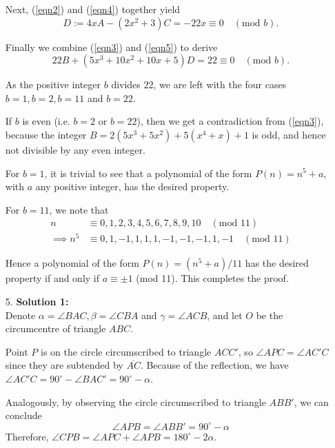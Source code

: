 \documentclass[a4paper, 12pt]{article}
\begin{document}
\begin{enumerate}
	Next, (\ref{eqn2}) and (\ref{eqn4}) together yield
	\begin{equation} \label{eqn5}
	    D := 4xA - (2x^2 + 3)C = -22x \equiv 0 \quad (\textrm{mod } b).
	\end{equation}
	
	Finally we combine (\ref{eqn3}) and (\ref{eqn5}) to derive
	\begin{equation*}
	    22B + (5x^3 + 10x^2 + 10x + 5)D = 22 \equiv 0 \quad (\textrm{mod } b).
	\end{equation*}
	
	As the positive integer $b$ divides $22$, we are left with the four cases $b = 1, b = 2, b = 11$ and $b = 22$.
	
    If $b$ is even (i.e. $b = 2$ or $b = 22$), then we get a contradiction from (\ref{eqn3}), because the integer $B = 2(5x^3 + 5x^2) + 5(x^4 + x) + 1$ is odd, and hence not divisible by any even integer.
    
    For $b = 1$, it is trivial to see that a polynomial of the form $P(n) = n^5 + a$, with $a$ any positive integer, has the desired property.
    
    For $b = 11$, we note that
    \begin{align*}
        n &\equiv 0, 1, 2, 3, 4, 5, 6, 7, 8, 9, 10 \quad (\textrm{mod } 11) \\
        \implies n^5 &\equiv 0, 1, -1, 1, 1, 1, -1, -1, -1, 1, -1 \quad (\textrm{mod } 11)
    \end{align*}
    
    Hence a polynomial of the form $P(n) = (n^5 + a)/11$ has the desired property if and only if $a \equiv \pm 1$ (mod 11). This completes the proof.
	
	\item[5.] \textbf{Solution 1:} \\
	Denote $\alpha = \angle BAC, \beta = \angle CBA$ and $\gamma = \angle ACB$, and let $O$ be the circumcentre of triangle $ABC$.
	
	
	Point $P$ is on the circle circumscribed to triangle $ACC'$, so $\angle APC = \angle AC'C$ since they are subtended by $\overline{AC}$. Because of the reflection, we have $\angle AC'C = 90^\circ - \angle BAC' = 90^\circ - \alpha$.
	
	Analogously, by observing the circle circumscribed to triangle $ABB'$, we can conclude
	$$ \angle APB = \angle ABB' = 90^\circ - \alpha $$
	Therefore, $\angle CPB = \angle APC + \angle APB = 180^\circ - 2 \alpha$.
	

\end{enumerate}
\end{document}
